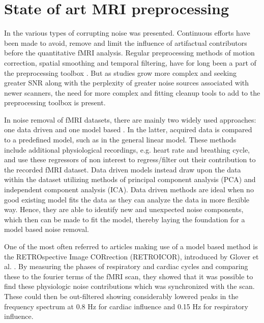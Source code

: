 \section{State of art MRI preprocessing}

In  the various types of corrupting noise was presented. Continuous efforts have been made to avoid, remove and limit the influence of artifactual contributors before the quantitative fMRI analysis. Regular preprocessing methods of motion correction, spatial smoothing and temporal filtering, have for long been a part of the preprocessing toolbox \cite{Poldrack2011}. But as studies grow more complex and seeking greater SNR along with the perplexity of greater noise sources associated with newer scanners, the need for more complex and fitting cleanup tools to add to the preprocessing toolbox is present. \cite{Wood2012,Liu2006} 

In noise removal of fMRI datasets, there are mainly two widely used approaches: one data driven and one model based \cite{Salimi-Khorshidi2014,Iraji2016}.  In the latter, acquired data is compared to a predefined model, such as in the general linear model. These methods include additional physiological recordings, e.g. heart rate and breathing cycle, and use these regressors of non interest to regress/filter out their contribution to the recorded fMRI dataset. \cite{Salimi-Khorshidi2014,Iraji2016,Monti2011} Data driven models instead draw upon the data within the dataset utilizing methods of principal component analysis (PCA) and independent component analysis (ICA). Data driven methods are ideal when no good existing model fits the data as they can analyze the data in more flexible way. Hence, they are able to identify new and unexpected noise components, which then can be made to fit the model, thereby laying the foundation for a model based noise removal. \cite{Iraji2016}

One of the most often referred to articles making use of a model based method is the RETROspective Image CORrection (RETROICOR), introduced by Glover et al. \cite{Glover2000}. By measuring the phases of respiratory and cardiac cycles and comparing these to the fourier terms of the fMRI scan, they showed that it was possible to find these physiologic noise contributions which was synchronized with the scan. These could then be out-filtered showing considerably lowered peaks in the frequency spectrum at 0.8 Hz for cardiac influence and 0.15 Hz for respiratory influence. \cite{Glover2000} 

